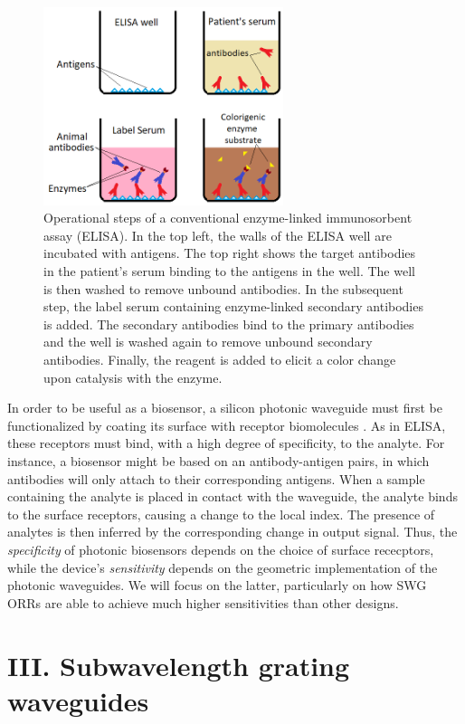 \documentclass[aps,prl,twocolumn, superscriptaddress,nobalancelastpage]{revtex4}
\begin{document}
 \begin{figure}[!h]
    \centering
    \includegraphics[width=7cm]{ELISA_well.png}
    \caption{Operational steps of a conventional enzyme-linked immunosorbent assay (ELISA). In the top left, the walls of the ELISA well are incubated with antigens. The top right shows the target antibodies in the patient's serum binding to the antigens in the well. The well is then washed to remove unbound antibodies. In the subsequent step, the label serum containing enzyme-linked secondary antibodies is added. The secondary antibodies bind to the primary antibodies and the well is washed again to remove unbound secondary antibodies. Finally, the reagent is added to elicit a color change upon catalysis with the enzyme.}
    \label{fig:ELISA_well}
\end{figure}

In order to be useful as a biosensor, a silicon photonic waveguide must first be functionalized by coating its surface with receptor biomolecules \cite{swg1}. As in ELISA, these receptors must bind, with a high degree of specificity, to the analyte. For instance, a biosensor might be based on an antibody-antigen pairs, in which antibodies will only attach to their corresponding antigens. When a sample containing the analyte is placed in contact with the waveguide, the analyte binds to the surface receptors, causing a change to the local index. The presence of analytes is then inferred by the corresponding change in output signal. Thus, the \textit{specificity} of photonic biosensors depends on the choice of surface rececptors, while the device's \textit{sensitivity} depends on the geometric implementation of the photonic waveguides. We will focus on the latter, particularly on how SWG ORRs are able to achieve much higher sensitivities than other designs.

\vspace{-1em}
\section{III. Subwavelength grating waveguides}
\vspace{-1em}
\end{document}
